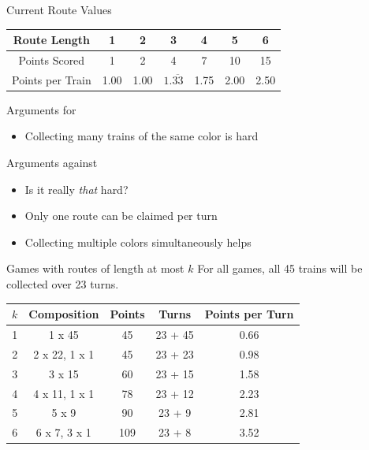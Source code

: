 \documentclass[12pt]{beamer}
\begin{document}
\begin{frame}{Current Route Values}
    \begin{center}
    \begin{tabular}{| c | c | c | c | c | c | c |}
    \hline
     Route Length & 1 & 2 & 3 & 4 & 5 & 6\\
     \hline
     Points Scored & 1 & 2 & 4 & 7 & 10 & 15\\
     \hline
     Points per Train & 1.00 & 1.00 & $1.\overline{33}$ 
     & 1.75 & 2.00 & 2.50\\
     \hline
    \end{tabular}
    \end{center}
    \pause
    Arguments for
    \begin{itemize}
        \item Collecting many trains of the same color is hard
    \end{itemize}
    Arguments against
    \begin{itemize}
        \item Is it really \textit{that} hard?
        \item Only one route can be claimed per turn
        \item Collecting multiple colors simultaneously helps
    \end{itemize}
\end{frame}

\begin{frame}{Games with routes of length at most $k$}
    For all games, all 45 trains will be collected over 23 turns.\footnotemark[2]
    
    \vspace{.5cm}
    \renewcommand{\arraystretch}{1.5}
    \begin{tabular}{| c | c | c | c | c |}
    \hline
    $k$ & Composition & Points & Turns & Points per Turn\\
    \hline
    1 & 1 x 45 & 45 & 23 + 45 & 0.66\\
    \hline
    2 & 2 x 22, 1 x 1 & 45 & 23 + 23 & 0.98\\
    \hline
    3 & 3 x 15 & 60 & 23 + 15 & 1.58\\
    \hline
    4 & 4 x 11, 1 x 1 & 78 & 23 + 12 & 2.23\\
    \hline
    5 & 5 x 9 & 90 & 23 + 9 & 2.81\\
    \hline
    6 & 6 x 7, 3 x 1 & 109 & 23 + 8 & 3.52\\
    \hline
    \end{tabular}
\end{frame}
\end{document}
